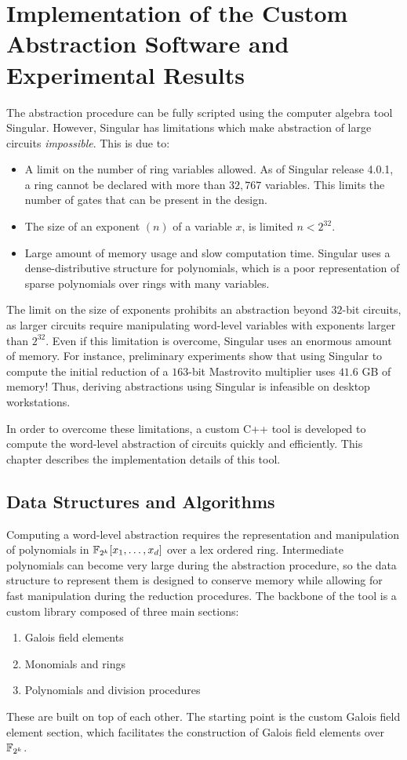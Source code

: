 \chapter{Implementation of the Custom Abstraction Software and Experimental Results} \label{ch:implement}

The abstraction procedure can be fully scripted using the computer algebra tool 
{\sc Singular}. However, {\sc Singular} has limitations which make abstraction
of large circuits {\it impossible}. This is due to:
\begin{itemize}
\item A limit on the number of ring variables allowed. As of {\sc Singular} release 4.0.1, 
a ring cannot be declared with more than $32,767$ variables. This limits the number
of gates that can be present in the design.
\item The size of an exponent $(n)$ of a variable $x$, is limited $n<2^{32}$.
\item Large amount of memory usage and slow computation time. 
{\sc Singular} uses a dense-distributive structure for polynomials, which is a poor 
representation of sparse polynomials over rings with many variables.
\end{itemize}
The limit on the size of exponents prohibits an abstraction beyond $32$-bit circuits,
as larger circuits require manipulating word-level variables with exponents 
larger than $2^{32}$. Even
if this limitation is overcome, Singular uses an enormous amount of memory.
For instance, preliminary experiments show that using Singular to compute the
initial reduction of a $163$-bit Mastrovito multiplier uses $41.6$ GB of memory!
Thus, deriving abstractions using Singular is infeasible on 
desktop workstations.

In order to overcome these limitations, a custom C++ tool is developed to 
compute the word-level abstraction of circuits quickly and efficiently. 
This chapter describes the implementation details of this tool.

\section{Data Structures and Algorithms}

Computing a word-level abstraction requires the representation and manipulation 
of polynomials in ${\mathbb{F}}_{2^k}[x_1,\dots,x_d]$ over a lex ordered ring. 
Intermediate polynomials can become 
very large during the abstraction procedure, so the data structure to represent them 
is designed to 
conserve memory while allowing for fast manipulation during the reduction 
procedures. The backbone of the tool is a custom library composed of three main
sections:
\begin{enumerate}
\item Galois field elements
\item Monomials and rings
\item Polynomials and division procedures
\end{enumerate}
These are built on top of each other. The starting point is the custom 
Galois field element section, which facilitates the construction of 
Galois field elements over ${\mathbb{F}}_{2^k}$.

